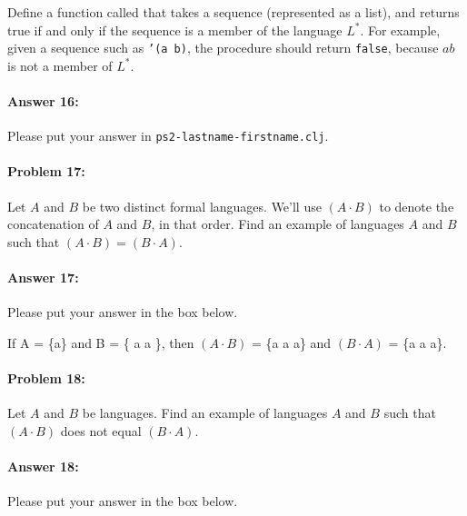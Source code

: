 \documentclass[10pt]{article}
\newenvironment{AnswerBox}{\begin{mdframed}[style=simple]}{\end{mdframed}}
\newcommand{\required}[1]{{\color{blue}{#1}}}
\newcommand{\PSnum}{2}
\begin{document}
Define a function called \required{\texttt{in-L-star?}} that takes a sequence
(represented as a list), and returns true if and only if the sequence is a
member of the language $L^*$. For example, given a sequence such as \texttt{'(a
b)}, the procedure should return \texttt{false}, because $ab$ is not a member of
$L^*$.

\paragraph{Answer 16:} Please put your answer in
\texttt{ps\PSnum-lastname-firstname.clj}.

\noindent\hrulefill %

\paragraph{Problem 17:}
Let $A$ and $B$ be two distinct formal languages. We'll use $(A\cdot B)$ to
denote the concatenation of $A$ and $B$, in that order. Find an example of
languages $A$ and $B$ such that $(A\cdot B)=(B\cdot A)$.

\paragraph{Answer 17:} Please put your answer in the box below.

\begin{AnswerBox}%


  If A = \{a\} and B = \{ a a \}, then $(A\cdot B)$ = \{a a a\} and $(B\cdot A)$ = \{a a a\}.
  

\end{AnswerBox}%

\noindent\hrulefill %

\paragraph{Problem 18:}
Let $A$ and $B$ be languages. Find an example of languages $A$ and $B$ such that
$(A\cdot B)$ does not equal $(B\cdot A)$.

\paragraph{Answer 18:} Please put your answer in the box below.
\end{document}
